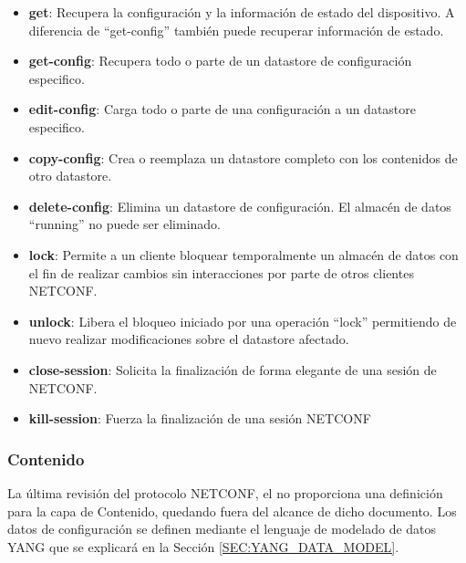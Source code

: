 \begin{itemize}
    \item \textbf{get}: Recupera la configuración y la información de estado del dispositivo. A diferencia de ``get-config'' también puede recuperar información de estado.
    \item \textbf{get-config}: Recupera todo o parte de un datastore de configuración especifico. 
    \item \textbf{edit-config}: Carga todo o parte de una configuración a un datastore especifico.
    \item \textbf{copy-config}: Crea o reemplaza un datastore completo con los contenidos de otro datastore.
    \item \textbf{delete-config}: Elimina un datastore de configuración. El almacén de datos ``running'' no puede ser eliminado.
    \item \textbf{lock}: Permite a un cliente bloquear temporalmente un almacén de datos con el fin de realizar cambios sin interacciones por parte de otros clientes \gls{NETCONF}.
    \item \textbf{unlock}: Libera el bloqueo iniciado por una operación ``lock'' permitiendo de nuevo realizar modificaciones sobre el datastore afectado.
    \item \textbf{close-session}: Solicita la finalización de forma elegante de una sesión de \gls{NETCONF}.
    \item \textbf{kill-session}: Fuerza la finalización de una sesión \gls{NETCONF}
\end{itemize}

\subsubsection{Contenido}

La última revisión del protocolo \gls{NETCONF}, el \cite{RFC6241} no proporciona una definición para la capa de Contenido, quedando fuera del alcance de dicho documento. Los datos de configuración se definen mediante el lenguaje de modelado de datos YANG que se explicará en la Sección \ref{SEC:YANG_DATA_MODEL}.




